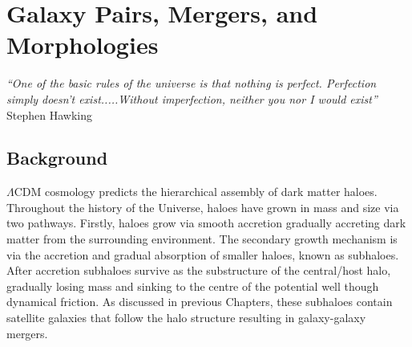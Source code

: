 
\chapter{Galaxy Pairs, Mergers, and Morphologies} 
\label{Chapter:GalPairs}
\begin{center}
    \textit{``One of the basic rules of the universe is that nothing is perfect. Perfection simply doesn't exist.....Without imperfection, neither you nor I would exist''}
    Stephen Hawking
\end{center}

\section{Background}

$\Lambda$CDM cosmology predicts the hierarchical assembly of dark matter haloes.
Throughout the history of the Universe, haloes have grown in mass and size via two pathways. 
Firstly, haloes grow via smooth accretion gradually accreting dark matter from the surrounding environment. 
The secondary growth mechanism is via the accretion and gradual absorption of smaller haloes, known as subhaloes. 
After accretion subhaloes survive as the substructure of the central/host halo, gradually losing mass and sinking to the centre of the potential well though dynamical friction. As discussed in previous Chapters, these subhaloes contain satellite galaxies that follow the halo structure resulting in galaxy-galaxy mergers.

